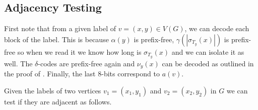 \documentclass[10pt, conference, compsocconf]{IEEEtran}
\begin{document}
\subsection{Adjacency Testing}

First note that from a given label of $v=(x,y) \in V(G)$, we can decode each block of the label.
This is because $\alpha(y)$ is prefix-free, $\gamma(|\sigma_{T_y}(x)|)$ is prefix-free so when we read it we know how long is $\sigma_{T_y}(x)$ and we can isolate it as well.
The $\delta$-codes are prefix-free again and $\nu_y(x)$ can be decoded as outlined in the proof of .
Finally, the last $8$-bits correspond to $a(v)$.

Given the labels of two vertices $v_1=(x_1,y_1)$ and $v_2=(x_2,y_2)$ in $G$ we can test if they are adjacent as follows.
\end{document}
